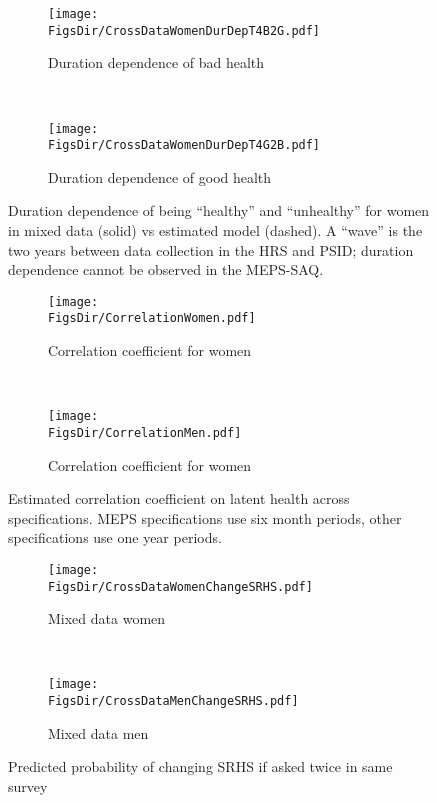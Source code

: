 \documentclass[12pt,pdftex,letterpaper]{article}
\newcommand{\RootDir}{..}
\newcommand{\FigsDir}{\RootDir/Figures}
\begin{document}
\newpage

\begin{figure}[H]
	\centering
	\begin{subfigure}[b]{0.48\textwidth}
		\texttt{[image: \\FigsDir/CrossDataWomenDurDepT4B2G.pdf]}
		\caption{Duration dependence of bad health}\label{fig:DurDepMixedWomenB2G}
	\end{subfigure}
	~
	\begin{subfigure}[b]{0.48\textwidth}
		\texttt{[image: \\FigsDir/CrossDataWomenDurDepT4G2B.pdf]}
		\caption{Duration dependence of good health}\label{fig:DurDepMixedomenG2B}
	\end{subfigure}
	\caption{Duration dependence of being ``healthy'' and ``unhealthy'' for women in mixed data (solid) vs estimated model (dashed).  A ``wave'' is the two years between data collection in the HRS and PSID; duration dependence cannot be observed in the MEPS-SAQ.}\label{fig:DurDepMixedWomen}
\end{figure}


\vspace{-0.5cm}
\begin{figure}[H]
	\centering
	\begin{subfigure}[b]{0.48\textwidth}
		\texttt{[image: \\FigsDir/CorrelationWomen.pdf]}
		\caption{Correlation coefficient for women}\label{fig:CorrWomen}
	\end{subfigure}
	~
	\begin{subfigure}[b]{0.48\textwidth}
		\texttt{[image: \\FigsDir/CorrelationMen.pdf]}
		\caption{Correlation coefficient for women}\label{fig:CorrMen}
	\end{subfigure}
	\caption{Estimated correlation coefficient on latent health across specifications.  MEPS specifications use six month periods, other specifications use one year periods.}\label{fig:Correlation}
\end{figure}

\vspace{-0.5cm}
\begin{figure}[H]
	\centering
	\begin{subfigure}[b]{0.48\textwidth}
		\texttt{[image: \\FigsDir/CrossDataWomenChangeSRHS.pdf]}
		\caption{Mixed data women}\label{fig:ChangeSRHSmixedWomen}
	\end{subfigure}
	~
	\begin{subfigure}[b]{0.48\textwidth}
		\texttt{[image: \\FigsDir/CrossDataMenChangeSRHS.pdf]}
		\caption{Mixed data men}\label{fig:ChangeSRHSmixedMen}
	\end{subfigure}
	\caption{Predicted probability of changing SRHS if asked twice in same survey}\label{fig:ChangeSRHSmixed}
\end{figure}
\end{document}
